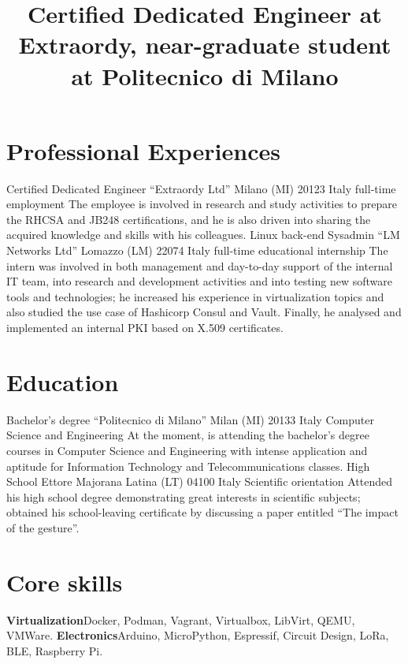 
\title{\normalsize%
    Certified Dedicated Engineer at Extraordy, near-graduate student at Politecnico di Milano
}
\maketitle

\section{Professional Experiences}
    {Certified Dedicated Engineer}
    {``Extraordy Ltd''}
    {Milano (MI) 20123 Italy}
    {full-time employment}
    {The employee is involved in research and study activities to prepare the RHCSA and JB248 certifications, and he is also driven into sharing the acquired knowledge and skills with his colleagues.}
    {Linux back-end Sysadmin}
    {``LM Networks Ltd''}
    {Lomazzo (LM) 22074 Italy}
    {full-time educational internship}
    {The intern was involved in both management and day-to-day support of the internal IT team, into research and development activities and into testing new software tools and technologies; he increased his experience in virtualization topics and also studied the use case of Hashicorp Consul and Vault. Finally, he analysed and implemented an internal PKI based on X.509 certificates.}

\section{Education}
    {Bachelor's degree}
    {``Politecnico di Milano''}
    {Milan (MI) 20133 Italy}
    {Computer Science and Engineering}
    {At the moment, is attending the bachelor's degree courses in Computer Science and Engineering with intense application and aptitude for Information Technology and Telecommunications classes.}
    {High School}
    {Ettore Majorana}
    {Latina (LT) 04100 Italy}
    {Scientific orientation}
    {Attended his high school degree demonstrating great interests in scientific subjects; obtained his school-leaving certificate by discussing a paper entitled ``The impact of the gesture''.}

\section{Core skills}
    {\textbf{Virtualization}}{Docker, Podman, Vagrant, Virtualbox, LibVirt, QEMU, VMWare.}
    {\textbf{Electronics}}{Arduino, MicroPython, Espressif, Circuit Design, LoRa, BLE, Raspberry Pi.}

